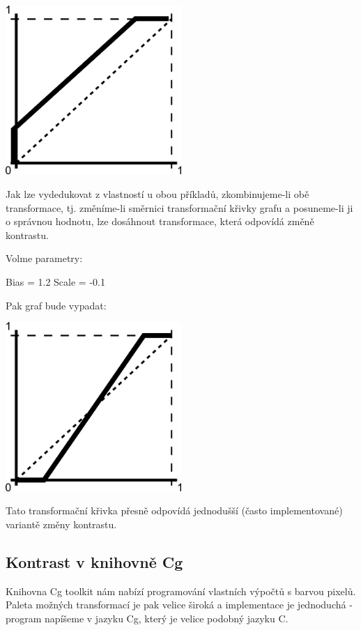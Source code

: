 \begin{center}
\includegraphics[width=0.5\textwidth]{Text/IMG/Scale.png}
\end{center}

Jak lze vydedukovat z vlastností u obou příkladů, zkombinujeme-li obě transformace, tj. změníme-li směrnici transformační křivky grafu a posuneme-li ji o správnou hodnotu, lze dosáhnout transformace, která odpovídá změně kontrastu.

Volme parametry:

Bias = 1.2
Scale = -0.1

Pak graf bude vypadat:

\begin{center}
\includegraphics[width=0.5\textwidth]{Text/IMG/BiasScale.png}
\end{center}

Tato transformační křivka přesně odpovídá jednodušší (často implementované) variantě změny kontrastu.



\subsection{Kontrast v knihovně Cg}
Knihovna Cg toolkit nám nabízí programování vlastních výpočtů s barvou pixelů. Paleta možných transformací je pak velice široká a implementace je jednoduchá - program napíšeme v jazyku Cg, který je velice podobný jazyku C.

